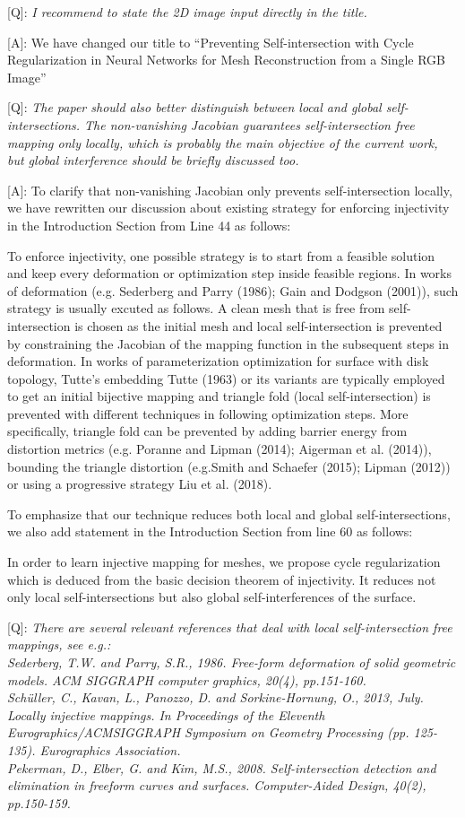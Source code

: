 \documentclass[10pt]{letter} %
\newcommand{\mdf}[1]{\textcolor[rgb]{1.00,0.00,1.00}{#1}}
\begin{document}
	[Q]: \emph{I recommend to state the 2D image input directly in the title.}
	
	[A]: We have changed our title to ``Preventing Self-intersection with Cycle Regularization \mdf{in Neural Networks for Mesh Reconstruction from a Single RGB Image}''
	
	[Q]: \emph{The paper should also better distinguish between local and global self-intersections. The non-vanishing Jacobian guarantees self-intersection free mapping only locally, which is probably the main objective of the current work, but global interference should be briefly discussed too.}
	
	[A]: To clarify that non-vanishing Jacobian only prevents self-intersection locally, we have rewritten our discussion about existing strategy for enforcing injectivity in the Introduction Section from Line 44 as follows:
	
	\mdf{To enforce injectivity, one possible strategy is to start from a feasible solution and keep every deformation or optimization step inside feasible regions. In works of deformation (e.g. Sederberg and Parry (1986); Gain and Dodgson (2001)), such strategy is usually excuted as follows. A clean mesh that is free from self-intersection is chosen as the initial mesh and local self-intersection is prevented by constraining the Jacobian of the mapping function in the subsequent steps in deformation. In works of parameterization optimization for surface with disk topology, Tutte’s embedding Tutte (1963) or its variants are typically employed to get an initial bijective mapping and triangle fold (local self-intersection) is prevented with different techniques in following optimization steps. More specifically, triangle fold can be prevented by adding barrier energy from distortion metrics (e.g. Poranne and Lipman (2014); Aigerman et al. (2014)), bounding the triangle distortion (e.g.Smith and Schaefer (2015); Lipman (2012)) or using a progressive strategy Liu et al. (2018).}
	
	To emphasize that our technique reduces both local and global self-intersections, we also add statement in the Introduction Section from line 60 as follows:
	
	In order to learn injective mapping for meshes, \mdf{we propose cycle regularization which is deduced from the basic decision theorem of injectivity. It reduces not only local self-intersections but also global self-interferences of the surface.}
	
	[Q]: 
	\emph{There are several relevant references that deal with local self-intersection free mappings, see e.g.:\\
	Sederberg, T.W. and Parry, S.R., 1986. Free-form deformation of solid geometric models. ACM SIGGRAPH computer graphics, 20(4), pp.151-160.\\
	Schüller, C., Kavan, L., Panozzo, D. and Sorkine-Hornung, O., 2013, July. Locally injective mappings. In Proceedings of the Eleventh Eurographics/ACMSIGGRAPH Symposium on Geometry Processing (pp. 125-135). Eurographics Association.\\
	Pekerman, D., Elber, G. and Kim, M.S., 2008. Self-intersection detection and elimination in freeform curves and surfaces. Computer-Aided Design, 40(2), pp.150-159.}
\end{document}
